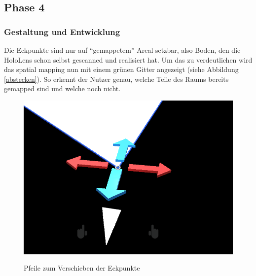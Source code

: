 \subsection{Phase 4}

\subsubsection{Gestaltung und Entwicklung}

Die Eckpunkte sind nur auf \enquote{gemappetem} Areal setzbar, also Boden, den die HoloLens schon selbst gescanned und realisiert hat. Um das zu verdeutlichen wird das spatial mapping nun mit einem grünen Gitter angezeigt (siehe Abbildung \ref{abstecken}). So erkennt der Nutzer genau, welche Teile des Raums bereits gemapped sind und welche noch nicht.

\begin{figure}[h]
	\begin{center}
		\noindent\includegraphics[scale=0.5]{Resources/Artefakt/punktVersch.png}
		\label{pfeile}
		\caption{Pfeile zum Verschieben der Eckpunkte}	
	\end{center}
\end{figure}

